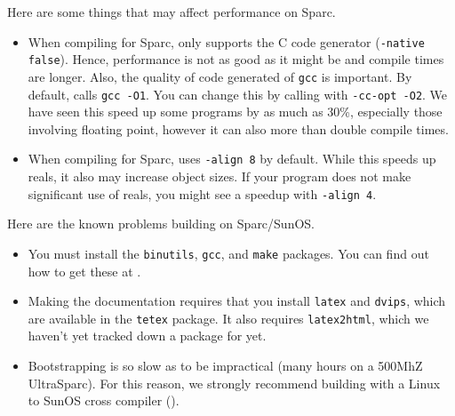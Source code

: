 
Here are some things that may affect performance on Sparc.
\begin{itemize}

\item
When compiling for Sparc, {\mlton} only supports the C code generator
({\tt -native false}).  Hence, performance is not as good as it might
be and compile times are longer.  Also, the quality of code generated
of {\tt gcc} is important.  By default, {\mlton} calls {\tt gcc -O1}.
You can change this by calling {\mlton} with {\tt -cc-opt -O2}.  We
have seen this speed up some programs by as much as 30\%, especially
those involving floating point, however it can also more than double
compile times.

\item
When compiling for Sparc, {\mlton} uses {\tt -align 8} by default.
While this speeds up reals, it also may increase object sizes.  If
your program does not make significant use of reals, you might see a
speedup with {\tt -align 4}.

\end{itemize}
Here are the known problems building {\mlton} on Sparc/SunOS.

\begin{itemize}

\item You must install the {\tt binutils}, {\tt gcc}, and {\tt make}
packages.  You can find out how to get these at
.

\item Making the documentation requires that you install {\tt latex}
and {\tt dvips}, which are available in the {\tt tetex} package.  It
also requires {\tt latex2html}, which we haven't yet tracked down a
package for yet.

\item Bootstrapping is so slow as to be impractical (many hours on a
500MhZ UltraSparc).  For this reason, we strongly recommend building
with a Linux to SunOS cross compiler ().

\end{itemize}
